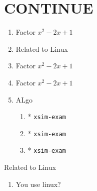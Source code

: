 \documentclass{article}
\begin{document}
\section{CONTINUE}



\begin{enumerate}[columns=1, resume, start=20, nosep,save-ref=true,wrap-label={\fbox{#1}}]
  \item Factor $x^{2}-2x+1$ %
  \item Related to Linux
   \item Factor $x^{2}-2x+1$ %
   \item Factor $x^{2}-2x+1$ %
   \item ALgo
         \begin{enumerate}[nosep]
          \item* \texttt{xsim-exam} %
           \item* \texttt{xsim-exam} %
            \item* \texttt{xsim-exam} %
        \end{enumerate}
\end{enumerate}



\begin{enumerate*}[columns=1]
  \item Related to Linux
    \begin{enumerate}[nosep,columns*=2,start=M]
      \item You use linux? %
    \end{enumerate}
\end{enumerate*}


\stop
\newpage
\end{document}
